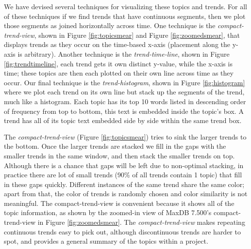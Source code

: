 \documentclass[times, 10pt,twocolumn]{article}
\newcommand{\hla}[1]{{\color{changecolor2} #1 }}
\newcommand{\shrinkit}{\vspace*{-.3em}}
\begin{document}
\shrinkit
{}
\shrinkit

We have devised several techniques for visualizing these topics and
trends.  For all of these techniques if we find trends that have
continuous segments, then we plot those segments as joined
horizontally across time. One technique is the \emph{compact-trend-view},
shown in Figure \ref{fig:topicsmear} and Figure \ref{fig:zoomedsmear},
that displays trends as they occur on the time-based x-axis
(placement along the y-axis is arbitrary).  Another technique is
the \emph{trend-time-line}, shown in Figure \ref{fig:trendtimeline},
each trend gets it own distinct y-value, while the x-axis is time;
these topics are then each plotted on their own line across time as
they occur. Our final technique is the \emph{trend-histogram}, shown in Figure
\ref{fig:histogram} where we plot each trend on its own line but stack
\hla{
up the segments of the trend, much like a histogram. Each topic has its top 10 words 
listed in descending order of frequency from top to bottom, this text is embedded inside the topic's box.
A trend has all of its topic text embedded side by side within the same trend box.
}

 The
\emph{compact-trend-view} (Figure \ref{fig:topicsmear}) tries to sink
the larger trends to the bottom.  Once the larger trends are stacked
we fill in the gaps with the smaller trends in the same window, and
then stack the smaller trends on top.  Although there is a chance that
gaps will be left due to non-optimal stacking, in practice there are
lot of small trends (90\% of all trends contain 1 topic) that fill in
these gaps quickly.  Different instances of the same trend share the
same color; apart from that, the color of trends is randomly chosen
and color similarity is not meaningful.  The compact-trend-view is
convenient because it shows all of the topic information, as shown by
the zoomed-in view of MaxDB 7.500's compact-trend-view in Figure
\ref{fig:zoomedsmear}. The \emph{compact-trend-view} makes repeating
continuous trends easy to pick out, although discontinuous trends are
harder to spot, and provides a general summary of the topics within a project.
\end{document}

